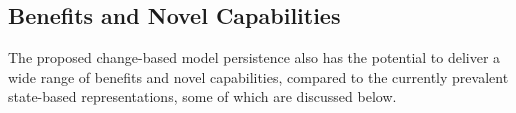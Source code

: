 %
%

\subsection{Benefits and Novel Capabilities}
\label{sec:benefits_and_novel_capabilities}

The proposed change-based model persistence also has the potential to deliver a wide range of benefits and novel capabilities, compared to the currently prevalent state-based representations, some of which are discussed below.


